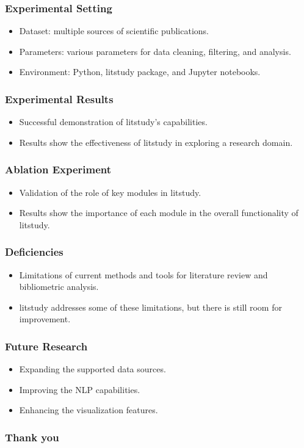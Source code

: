\documentclass{beamer}
\begin{document}
\begin{frame}
\frametitle{Experimental Setting}
\begin{itemize}
\item Dataset: multiple sources of scientific publications.
\item Parameters: various parameters for data cleaning, filtering, and analysis.
\item Environment: Python, litstudy package, and Jupyter notebooks.
\end{itemize}
\end{frame}
\begin{frame}
\frametitle{Experimental Results}
\begin{itemize}
\item Successful demonstration of litstudy's capabilities.
\item Results show the effectiveness of litstudy in exploring a research domain.
\end{itemize}
\end{frame}
\begin{frame}
\frametitle{Ablation Experiment}
\begin{itemize}
\item Validation of the role of key modules in litstudy.
\item Results show the importance of each module in the overall functionality of litstudy.
\end{itemize}
\end{frame}
\begin{frame}
\frametitle{Deficiencies}
\begin{itemize}
\item Limitations of current methods and tools for literature review and bibliometric analysis.
\item litstudy addresses some of these limitations, but there is still room for improvement.
\end{itemize}
\end{frame}
\begin{frame}
\frametitle{Future Research}
\begin{itemize}
\item Expanding the supported data sources.
\item Improving the NLP capabilities.
\item Enhancing the visualization features.
\end{itemize}
\end{frame}
\begin{frame}
\frametitle{Thank you}
\end{frame}
\end{document}
